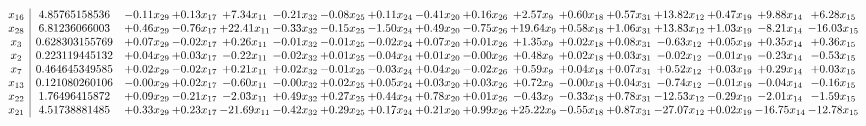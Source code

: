 \documentclass[9pt]{article}
\begin{document}
 \[\begin{array}{c| c c@{\hskip 2pt} c@{\hskip 2pt} c@{\hskip 2pt} c@{\hskip 2pt} c@{\hskip 2pt} c@{\hskip 2pt} c@{\hskip 2pt} c@{\hskip 2pt} c@{\hskip 2pt} c@{\hskip 2pt} c@{\hskip 2pt} c@{\hskip 2pt} c@{\hskip 2pt} c@{\hskip 2pt} c@{\hskip 2pt} }
 x_{16}   &  4.85765158536 & -0.11 x_{29} & +  0.13 x_{17} & +  7.34 x_{11} & -0.21 x_{32} & -0.08 x_{25} & +  0.11 x_{24} & -0.41 x_{20} & +  0.16 x_{26} & +  2.57 x_{9} & +  0.60 x_{18} & +  0.57 x_{31} & + 13.82 x_{12} & +  0.47 x_{19} & +  9.88 x_{14} & +  6.28 x_{15}\\
 x_{28}   &  6.81236066003 & +  0.46 x_{29} & -0.76 x_{17} & + 22.41 x_{11} & -0.33 x_{32} & -0.15 x_{25} & -1.50 x_{24} & +  0.49 x_{20} & -0.75 x_{26} & + 19.64 x_{9} & +  0.58 x_{18} & +  1.06 x_{31} & + 13.83 x_{12} & +  1.03 x_{19} & -8.21 x_{14} & -16.03 x_{15}\\
 x_{3}   &  0.628303155769 & +  0.07 x_{29} & -0.02 x_{17} & +  0.26 x_{11} & -0.01 x_{32} & -0.01 x_{25} & -0.02 x_{24} & +  0.07 x_{20} & +  0.01 x_{26} & +  1.35 x_{9} & +  0.02 x_{18} & +  0.08 x_{31} & -0.63 x_{12} & +  0.05 x_{19} & +  0.35 x_{14} & +  0.36 x_{15}\\
 x_{2}   &  0.223119445132 & +  0.04 x_{29} & +  0.03 x_{17} & -0.22 x_{11} & -0.02 x_{32} & +  0.01 x_{25} & -0.04 x_{24} & +  0.01 x_{20} & -0.00 x_{26} & +  0.48 x_{9} & +  0.02 x_{18} & +  0.03 x_{31} & -0.02 x_{12} & -0.01 x_{19} & -0.23 x_{14} & -0.53 x_{15}\\
 x_{7}   &  0.464645349585 & +  0.02 x_{29} & -0.02 x_{17} & +  0.21 x_{11} & +  0.02 x_{32} & -0.01 x_{25} & -0.03 x_{24} & +  0.04 x_{20} & -0.02 x_{26} & +  0.59 x_{9} & +  0.04 x_{18} & +  0.07 x_{31} & +  0.52 x_{12} & +  0.03 x_{19} & +  0.29 x_{14} & +  0.03 x_{15}\\
 x_{13}   &  0.121080260106 & -0.00 x_{29} & +  0.02 x_{17} & -0.60 x_{11} & -0.00 x_{32} & +  0.02 x_{25} & +  0.05 x_{24} & +  0.03 x_{20} & +  0.03 x_{26} & +  0.72 x_{9} & -0.00 x_{18} & +  0.04 x_{31} & -0.74 x_{12} & -0.01 x_{19} & -0.04 x_{14} & -0.16 x_{15}\\
 x_{22}   &  1.76496415872 & +  0.09 x_{29} & -0.21 x_{17} & -2.03 x_{11} & +  0.49 x_{32} & +  0.27 x_{25} & +  0.44 x_{24} & +  0.78 x_{20} & +  0.01 x_{26} & -0.43 x_{9} & -0.33 x_{18} & +  0.78 x_{31} & -12.53 x_{12} & -0.29 x_{19} & -2.01 x_{14} & -1.59 x_{15}\\
 x_{21}   &  4.51738881485 & +  0.33 x_{29} & +  0.23 x_{17} & -21.69 x_{11} & -0.42 x_{32} & +  0.29 x_{25} & +  0.17 x_{24} & +  0.21 x_{20} & +  0.99 x_{26} & + 25.22 x_{9} & -0.55 x_{18} & +  0.87 x_{31} & -27.07 x_{12} & +  0.02 x_{19} & -16.75 x_{14} & -12.78 x_{15}\\

\end{array}\]
\end{document}
